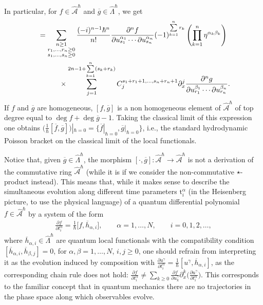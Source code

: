 \documentclass[pdftex]{sigma}
\numberwithin{equation}{section}
\newcommand{\og}{\overline g}
\newcommand{\oh}{\overline h}
\newcommand{\hLambda}{\widehat\Lambda}
\def\d{{\partial}}
\newcommand{\<}{\left<}
\renewcommand{\>}{\right>}
\newcommand{\hcA}{\widehat{\mathcal A}}
\renewcommand{\t}{\mathrm{t}}
\begin{document}
In particular, for $f\in \hcA^\hbar$ and $\og \in \hLambda^\hbar$, we get
\begin{gather*}
[f,\og]=\sum_{\substack{n\geq 1\\ r_1,\dots ,r_n\geq 0\\ s_1,\dots,s_n\geq 0}} \frac{(-i)^{n-1} \hbar^{n}}{n!} \frac{\partial^n f}{\partial u^{\alpha_1}_{s_1}\cdots \partial u^{\alpha_n}_{s_n}} (-1)^{\sum\limits_{k=1}^n r_k} \left( \prod_{k=1}^n \eta^{\alpha_k \beta_k}\right)\\
 \hphantom{[f,\og]=}{} \times \sum_{j=1}^{2n-1+\sum\limits_{k=1}^n (s_k+r_k)} C_j^{s_1+r_1+1,\dots,s_n+r_n+1} \partial_x^j \frac{\partial^n g}{\partial u^{\beta_1}_{r_1}\cdots \partial u^{\beta_n}_{r_n}}.
\end{gather*}
If $f$ and $\og$ are homogeneous, $[f,\og]$ is a non homogeneous element of $\hcA^\hbar$ of top degree equal to $\deg f + \deg \og - 1$. Taking the classical limit of this expression one obtains $\big(\frac{1}{\hbar}[\overline{f},\og]\big)|_{\hbar=0}=\{\overline{f}|_{\hbar=0},\og|_{\hbar=0}\}$, i.e., the standard hydrodynamic Poisson bracket on the classical limit of the local functionals.

Notice that, given $\og \in \hLambda^\hbar$, the morphism $[\cdot,\og]\colon \hcA^\hbar\to\hcA^\hbar$ is not a derivation of the commutative ring $\hcA^\hbar$ (while it is if we consider the non-commutative $\star$-product instead). This means that, while it makes sense to describe the simultaneous evolution along dif\/ferent time parameters $\t^\alpha_i$ (in the Heisenberg picture, to use the physical language) of a quantum dif\/ferential polynomial $f \in \hcA^\hbar$ by a system of the form
\begin{gather}\label{eq:quantum Hamiltonian system}
\frac{\partial f}{\partial t^\alpha_i} = \frac{1}{\hbar}\big[f,\oh_{\alpha,i}\big], \qquad \alpha=1,\dots,N, \qquad i=0,1,2,\dots,
\end{gather}
where $\oh_{\alpha,i}\in\hLambda^\hbar$ are quantum local functionals with the compatibility condition $[\oh_{\alpha,i},\oh_{\beta,j}]=0$, for $\alpha,\beta=1,\dots,N$, $i,j\geq 0$, one should refrain from interpreting it as the evolution induced by composition with $\frac{\d u^\gamma}{\d t^\alpha_i}=\frac{1}{\hbar} [u^\gamma,\oh_{\alpha,i}]$, as the corresponding chain rule does not hold: $\frac{\d f}{\partial t^\alpha_i} \neq \sum\limits_{k\geq 0}\frac{\d f}{\d u^\gamma_k}\d_x^k \big(\frac{\d u^\gamma}{\d t^\alpha_i}\big)$. This corresponds to the familiar concept that in quantum mechanics there are no trajectories in the phase space along which observables evolve.
\end{document}
